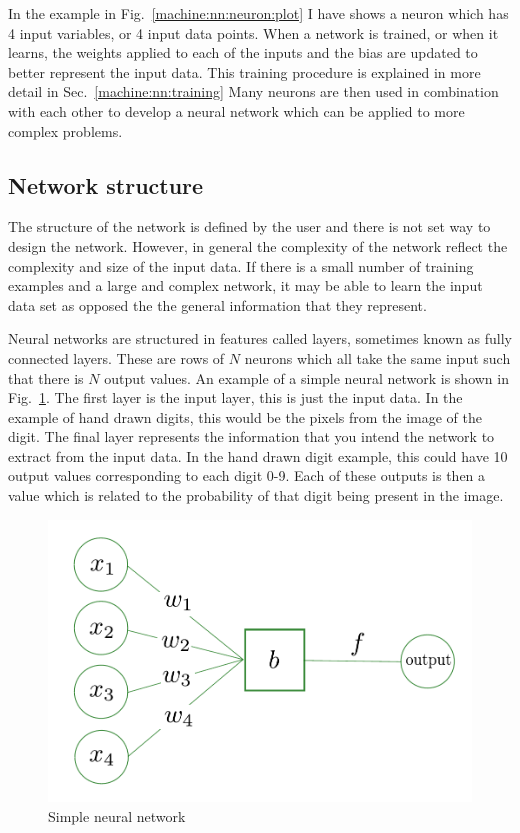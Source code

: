 In the example in Fig.~\ref{machine:nn:neuron:plot} I have shows a neuron which has 4 input variables, or 4 input data points. 
When a network is trained, or when it learns, the weights applied to each of the inputs and the bias are updated to better represent the input data.
This training procedure is explained in more detail in Sec.~\ref{machine:nn:training}
Many neurons are then used in combination with each other to develop a neural network which can be applied to more complex problems.

\subsection{\label{machine:nn:structure}Network structure}

The structure of the network is defined by the user and there is not set way to design the network.
However, in general the complexity of the network reflect the complexity and size of the input data.
If there is a small number of training examples and a large and complex network, it may be able to learn the input data set as opposed the the general information that they represent.

Neural networks are structured in features called layers, sometimes known as fully connected layers. 
These are rows of $N$ neurons which all take the same input such that there is $N$ output values.
An example of a simple neural network is shown in Fig.~\ref{machine:nn:structure:plot}.
The first layer is the input layer, this is just the input data.
In the example of hand drawn digits, this would be the pixels from the image of the digit.
The final layer represents the information that you intend the network to extract from the input data. 
In the hand drawn digit example, this could have 10 output values corresponding to each digit 0-9. 
Each of these outputs is then a value which is related to the probability of that digit being present in the image.  

\begin{figure}[h]
    \centering
    \includegraphics[width=\columnwidth]{C3_cnn/neuron.pdf}
    \caption{Simple neural network}
    \label{machine:nn:structure:plot}
\end{figure}


